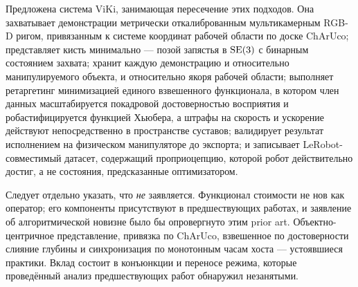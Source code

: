 \documentclass[12pt, a4paper, oneside]{report}
\begin{document}
Предложена система ViKi, занимающая пересечение этих подходов. Она захватывает
демонстрации метрически откалиброванным мультикамерным RGB-D ригом,
привязанным к системе координат рабочей области по доске ChArUco; представляет
кисть минимально --- позой запястья в $\mathrm{SE}(3)$ с бинарным состоянием захвата;
хранит каждую демонстрацию и относительно манипулируемого объекта, и
относительно якоря рабочей области; выполняет ретаргетинг минимизацией единого
взвешенного функционала, в котором член данных масштабируется покадровой
достоверностью восприятия и робастифицируется функцией Хьюбера, а штрафы на
скорость и ускорение действуют непосредственно в пространстве суставов;
валидирует результат исполнением на физическом манипуляторе до экспорта; и
записывает LeRobot-совместимый датасет, содержащий проприоцепцию, которой робот
действительно достиг, а не состояния, предсказанные оптимизатором.

Следует отдельно указать, что \emph{не} заявляется. Функционал стоимости не нов
как оператор; его компоненты присутствуют в предшествующих работах, и заявление
об алгоритмической новизне было бы опровергнуто этим prior art.
Объектно-центричное представление, привязка по ChArUco, взвешенное по
достоверности слияние глубины и синхронизация по монотонным часам хоста ---
устоявшиеся практики. Вклад состоит в конъюнкции и переносе режима, которые
проведённый анализ предшествующих работ обнаружил незанятыми.

\vspace{4mm}
\noindent{}
\end{document}
